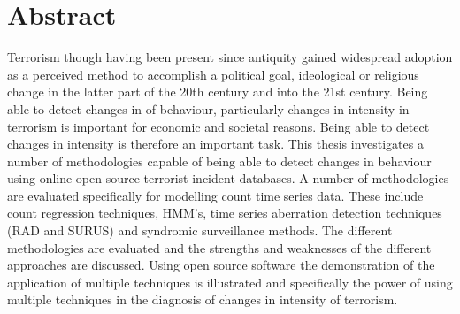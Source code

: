 
\chapter*{Abstract}


Terrorism though having been present since antiquity gained widespread adoption as a perceived method to accomplish a political goal, ideological or religious change in the latter part of the 20th century and into the 21st century. Being able to detect changes in of behaviour, particularly changes in intensity in terrorism is important for economic and societal reasons. Being able to detect changes in intensity is therefore an important task. This thesis investigates a number of methodologies capable of being able to detect changes in behaviour using online open source terrorist incident databases. A number of methodologies are evaluated specifically for modelling count time series data. These include count regression techniques, HMM's, time series aberration detection techniques (RAD and SURUS) and syndromic surveillance methods. The different methodologies are evaluated and the strengths and weaknesses of the different approaches are discussed. Using open source software the demonstration of the application of multiple techniques is illustrated and specifically the power of using multiple techniques in the diagnosis of changes in intensity of terrorism. 
